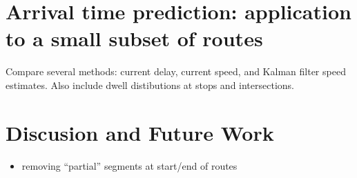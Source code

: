 \documentclass[draftcls,a4paper,onecolumn]{IEEEtran}\usepackage[]{graphicx}\usepackage[]{color}
\begin{document}
\section{Arrival time prediction: application to a small subset of routes}
\label{sec:results}


Compare several methods:
current delay, current speed, and Kalman filter speed estimates.
Also include dwell distibutions at stops and intersections.



\section{Discusion and Future Work}
\label{sec:discussion}

\begin{itemize}
\item removing ``partial'' segments at start/end of routes
\end{itemize}





\end{document}
